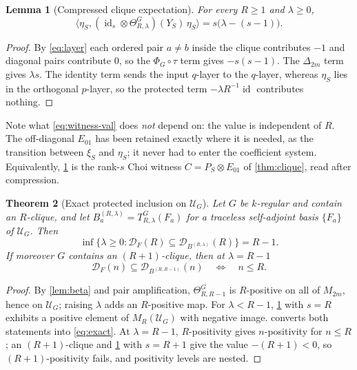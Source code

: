 \documentclass[11pt,reqno]{amsart}
\theoremstyle{plain}
\newtheorem{theorem}{Theorem}[section]
\newtheorem{lemma}[theorem]{Lemma}
\theoremstyle{remark}
\DeclareMathOperator{\id}{id}
\newcommand{\cU}{\mathcal U}
\newcommand{\cD}{\mathcal D}
\newcommand{\ip}[2]{\langle #1,#2\rangle}
\begin{document}
\begin{lemma}[Compressed clique expectation]
\label{lem:witness}
For every $R\ge1$ and $\lambda\ge0$,
\begin{equation}
\label{eq:witness-val}
    \ip{\eta_S}{(\id_s\otimes\Theta^G_{R,\lambda})(Y_S)\,\eta_S}
    =s\bigl(\lambda-(s-1)\bigr).
\end{equation}
\end{lemma}

\begin{proof}
By \cref{eq:layer} each ordered pair $a\neq b$ inside the clique contributes
$-1$ and diagonal pairs contribute $0$, so the $\Phi_G\circ\tau$ term gives
$-s(s-1)$.  The $\Delta_{2m}$ term gives $\lambda s$.  The identity term sends
the input $q$-layer to the $q$-layer, whereas $\eta_S$ lies in the orthogonal
$p$-layer, so the protected term $-\lambda R^{-1}\id$ contributes nothing.
\end{proof}

Note what \cref{eq:witness-val} does \emph{not} depend on: the value is
independent of $R$.  The off-diagonal $E_{01}$ has been retained exactly where
it is needed, as the transition between $\xi_S$ and $\eta_S$; it never had to
enter the coefficient system.  Equivalently, \cref{lem:witness} is the rank-$s$
Choi witness $C=P_S\otimes E_{01}$ of \cref{thm:clique}, read after
compression.

\begin{theorem}[Exact protected inclusion on $\cU_G$]
\label{thm:inclusion}
Let $G$ be $k$-regular and contain an $R$-clique, and let
$B^{(R,\lambda)}_a=T^G_{R,\lambda}(F_a)$ for a traceless self-adjoint basis
$\{F_a\}$ of $\cU_G$.  Then
\begin{equation}
\label{eq:exact}
    \inf\bigl\{\lambda\ge0:\cD_F(R)\subseteq\cD_{B^{(R,\lambda)}}(R)\bigr\}
    =R-1 .
\end{equation}
If moreover $G$ contains an $(R+1)$-clique, then at $\lambda=R-1$
\begin{equation}
\label{eq:levels}
    \cD_F(n)\subseteq\cD_{B^{(R,R-1)}}(n)
    \quad\Longleftrightarrow\quad
    n\le R .
\end{equation}
\end{theorem}

\begin{proof}
By \cref{lem:beta} and pair amplification, $\Theta^G_{R,R-1}$ is $R$-positive on
all of $M_{2m}$, hence on $\cU_G$; raising $\lambda$ adds an $R$-positive map.
For $\lambda<R-1$, \cref{lem:witness} with $s=R$ exhibits a positive element of
$M_R(\cU_G)$ with negative image.   converts both statements
into \cref{eq:exact}.  At $\lambda=R-1$, $R$-positivity gives $n$-positivity for
$n\le R$; an $(R+1)$-clique and \cref{lem:witness} with $s=R+1$ give the value
$-(R+1)<0$, so $(R+1)$-positivity fails, and positivity levels are nested.
\end{proof}
\end{document}
